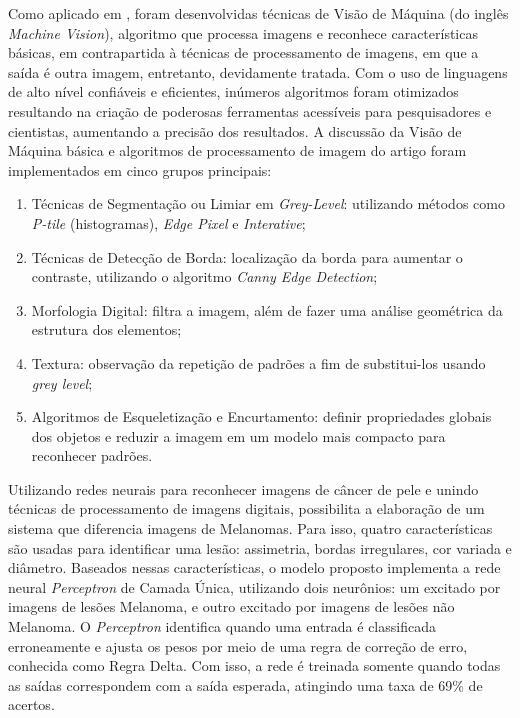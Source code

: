 Como aplicado em , foram desenvolvidas técnicas de Visão de Máquina (do inglês \textit{Machine Vision}), algoritmo que processa imagens e reconhece características básicas, em contrapartida à técnicas de processamento de imagens, em que a saída é outra imagem, entretanto, devidamente tratada. Com o uso de linguagens de alto nível confiáveis e eficientes, inúmeros algoritmos foram otimizados resultando na criação de poderosas ferramentas acessíveis para pesquisadores e cientistas, aumentando a precisão dos resultados. A discussão da Visão de Máquina básica e algoritmos de processamento de imagem do artigo foram implementados em cinco grupos principais: 
\begin{enumerate}
  \renewcommand{\labelenumi}{\alph{enumi})}
    \item Técnicas de Segmentação ou Limiar em \textit{Grey-Level}: utilizando métodos como \textit{P-tile} (histogramas), \textit{Edge Pixel} e \textit{Interative};
    
    \item Técnicas de Detecção de Borda: localização da borda para aumentar o contraste, utilizando o algoritmo \textit{Canny Edge Detection};
    
    \item Morfologia Digital: filtra a imagem, além de fazer uma análise geométrica da estrutura dos elementos;
    
    \item Textura: observação da repetição de padrões a fim de substitui-los usando \textit{grey level};
    
    \item Algoritmos de Esqueletização e Encurtamento: definir propriedades globais dos objetos e reduzir a imagem em um modelo mais compacto para reconhecer padrões.
\end{enumerate}


Utilizando redes neurais para reconhecer imagens de câncer de pele e unindo técnicas de processamento de imagens digitais,  possibilita a elaboração de um sistema que diferencia imagens de Melanomas. Para isso, quatro características são usadas para identificar uma lesão: assimetria, bordas irregulares, cor variada e diâmetro. Baseados nessas características, o modelo proposto implementa a rede neural \textit{Perceptron} de Camada Única, utilizando dois neurônios: um excitado por imagens de lesões Melanoma, e outro excitado por imagens de lesões não Melanoma. O \textit{Perceptron} identifica quando uma entrada é classificada erroneamente e ajusta os pesos por meio de uma regra de correção de erro, conhecida como Regra Delta. Com isso, a rede é treinada somente quando todas as saídas correspondem com a saída esperada, atingindo uma taxa de 69\% de acertos.

